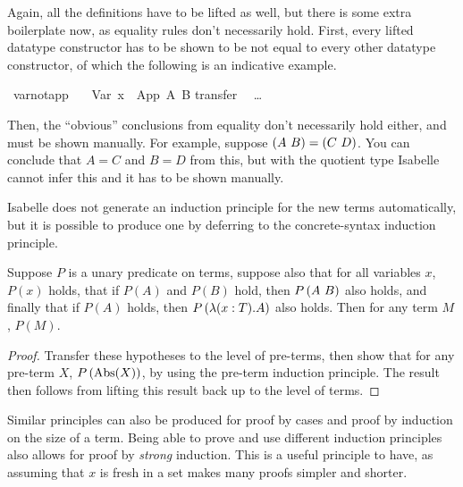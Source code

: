 Again, all the definitions have to be lifted as well, but there is some extra boilerplate now, as equality rules don't necessarily hold.
First, every lifted datatype constructor has to be shown to be not equal to every other datatype constructor, of which the following is an indicative example.

\begin{implementation}
\isamarkupfalse%
\ var{\isacharunderscore}not{\isacharunderscore}app{\isacharcolon}\isanewline
\ \ \ {\isachardoublequoteopen}Var\ x\ {\isasymnoteq}\ App\ A\ B{\isachardoublequoteclose}\isanewline
%
\isadelimproof
%
\endisadelimproof
%
\isatagproof
{}\isamarkupfalse%
{\isacharparenleft}transfer{\isacharparenright}\isanewline
\ \ \ldots\isanewline
{}\isamarkupfalse%
%
\endisatagproof
\end{implementation}

Then, the ``obvious'' conclusions from equality don't necessarily hold either, and must be shown manually.
For example, suppose \(\left(A\ B\right) = \left(C\ D\right)\).
You can conclude that \(A = C\) and \(B = D\) from this, but with the quotient type Isabelle cannot infer this and it has to be shown manually.

Isabelle does not generate an induction principle for the new terms automatically, but it is possible to produce one by deferring to the concrete-syntax induction principle.

\begin{lemma}
Suppose \(P\) is a unary predicate on terms, suppose also that for all variables \(x\), \(P(x)\) holds, that if \(P(A)\) and \(P(B)\) hold, then \(P\left(A\ B\right)\) also holds, and finally that if \(P(A)\) holds, then \(P\left(\lambda (x:T). A\right)\) also holds.
Then for any term \(M\), \(P(M)\).
\end{lemma}
\begin{proof}
Transfer these hypotheses to the level of pre-terms, then show that for any pre-term \(X\), \(P\left(\textrm{Abs}(X)\right)\), by using the pre-term induction principle.
The result then follows from lifting this result back up to the level of terms.
\end{proof}

Similar principles can also be produced for proof by cases and proof by induction on the size of a term.
Being able to prove and use different induction principles also allows for proof by \emph{strong} induction.
This is a useful principle to have, as assuming that \(x\) is fresh in a set makes many proofs simpler and shorter.

